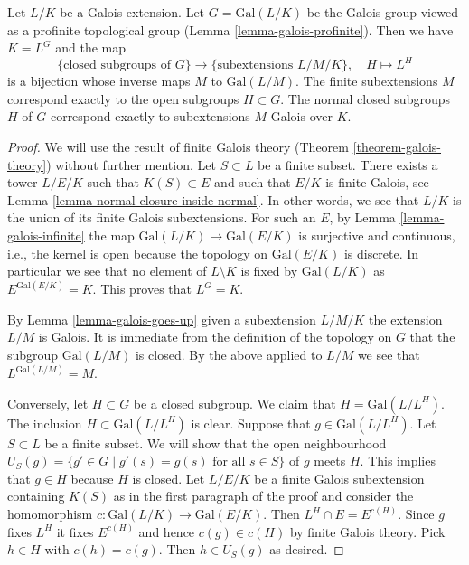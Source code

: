 \begin{theorem}
\label{theorem-inifinite-galois-theory}
Let $L/K$ be a Galois extension. Let $G = \text{Gal}(L/K)$
be the Galois group viewed as a profinite topological group
(Lemma \ref{lemma-galois-profinite}). Then we have $K = L^G$ and the map
$$
\{\text{closed subgroups of }G\}
\longrightarrow
\{\text{subextensions }L/M/K\},\quad
H \longmapsto L^H
$$
is a bijection whose inverse maps $M$ to $\text{Gal}(L/M)$.
The finite subextensions $M$ correspond exactly to the open
subgroups $H \subset G$. The normal closed subgroups $H$ of $G$
correspond exactly to subextensions $M$ Galois over $K$.
\end{theorem}

\begin{proof}
We will use the result of finite Galois theory
(Theorem \ref{theorem-galois-theory})
without further mention.
Let $S \subset L$ be a finite subset. There exists a tower
$L/E/K$ such that $K(S) \subset E$ and such that
$E/K$ is finite Galois, see Lemma \ref{lemma-normal-closure-inside-normal}.
In other words, we see that $L/K$ is the union of its finite
Galois subextensions.
For such an $E$, by Lemma \ref{lemma-galois-infinite}
the map $\text{Gal}(L/K) \to \text{Gal}(E/K)$ is surjective
and continuous, i.e., the kernel is open because the topology
on $\text{Gal}(E/K)$ is discrete.
In particular we see that no element of $L \setminus K$ is fixed by
$\text{Gal}(L/K)$ as $E^{\text{Gal}(E/K)} = K$.
This proves that $L^G = K$.

\medskip\noindent
By Lemma \ref{lemma-galois-goes-up} given a subextension $L/M/K$
the extension $L/M$ is Galois. It is immediate from the definition
of the topology on $G$ that the subgroup $\text{Gal}(L/M)$ is closed.
By the above applied to $L/M$ we see that $L^{\text{Gal}(L/M)} = M$.

\medskip\noindent
Conversely, let $H \subset G$ be a closed subgroup. We claim that
$H = \text{Gal}(L/L^H)$. The inclusion $H \subset \text{Gal}(L/L^H)$
is clear. Suppose that $g \in \text{Gal}(L/L^H)$. Let $S \subset L$
be a finite subset. We will show that the open neighbourhood
$U_S(g) = \{g' \in G \mid g'(s) = g(s)\text{ for all }s\in S\}$ of $g$ meets $H$.
This implies that $g \in H$ because $H$ is closed.
Let $L/E/K$ be a finite Galois subextension containing $K(S)$
as in the first paragraph of the proof and consider the homomorphism
$c : \text{Gal}(L/K) \to \text{Gal}(E/K)$.
Then $L^H \cap E = E^{c(H)}$. Since $g$ fixes $L^H$ it fixes
$E^{c(H)}$ and hence $c(g) \in c(H)$ by finite Galois theory.
Pick $h \in H$ with $c(h) = c(g)$. Then $h \in U_S(g)$ as desired.


\end{proof}
